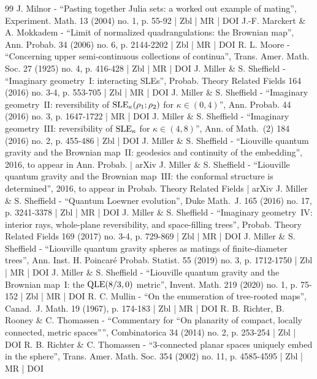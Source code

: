 \begin{thebibliography}{99}
J. Milnor - “Pasting together Julia sets: a worked out example of mating”, Experiment. Math. 13 (2004) no. 1, p. 55-92 | Zbl | MR | DOI
J.-F. Marckert \& A. Mokkadem - “Limit of normalized quadrangulations: the Brownian map”, Ann. Probab. 34 (2006) no. 6, p. 2144-2202 | Zbl | MR | DOI
R. L. Moore - “Concerning upper semi-continuous collections of continua”, Trans. Amer. Math. Soc. 27 (1925) no. 4, p. 416-428 | Zbl | MR | DOI
J. Miller \& S. Sheffield - “Imaginary geometry I: interacting SLEs”, Probab. Theory Related Fields 164 (2016) no. 3-4, p. 553-705 | Zbl | MR | DOI
J. Miller \& S. Sheffield - “Imaginary geometry II: reversibility of ${\rm SLE}_\kappa (\rho _1;\rho _2)$ for $\kappa \in (0,4)$”, Ann. Probab. 44 (2016) no. 3, p. 1647-1722 | MR | DOI
J. Miller \& S. Sheffield - “Imaginary geometry III: reversibility of $\rm SLE_\kappa $ for $\kappa \in (4,8)$”, Ann. of Math. (2) 184 (2016) no. 2, p. 455-486 | Zbl | DOI
J. Miller \& S. Sheffield - “Liouville quantum gravity and the Brownian map II: geodesics and continuity of the embedding”, 2016, to appear in Ann. Probab. | arXiv
J. Miller \& S. Sheffield - “Liouville quantum gravity and the Brownian map III: the conformal structure is determined”, 2016, to appear in Probab. Theory Related Fields | arXiv
J. Miller \& S. Sheffield - “Quantum Loewner evolution”, Duke Math. J. 165 (2016) no. 17, p. 3241-3378 | Zbl | MR | DOI
J. Miller \& S. Sheffield - “Imaginary geometry IV: interior rays, whole-plane reversibility, and space-filling trees”, Probab. Theory Related Fields 169 (2017) no. 3-4, p. 729-869 | Zbl | MR | DOI
J. Miller \& S. Sheffield - “Liouville quantum gravity spheres as matings of finite-diameter trees”, Ann. Inst. H. Poincaré Probab. Statist. 55 (2019) no. 3, p. 1712-1750 | Zbl | MR | DOI
J. Miller \& S. Sheffield - “Liouville quantum gravity and the Brownian map I: the ${\rm QLE}(8/3,0)$ metric”, Invent. Math. 219 (2020) no. 1, p. 75-152 | Zbl | MR | DOI
R. C. Mullin - “On the enumeration of tree-rooted maps”, Canad. J. Math. 19 (1967), p. 174-183 | Zbl | MR | DOI
R. B. Richter, B. Rooney \& C. Thomassen - “Commentary for “On planarity of compact, locally connected, metric spaces””, Combinatorica 34 (2014) no. 2, p. 253-254 | Zbl | DOI
R. B. Richter \& C. Thomassen - “3-connected planar spaces uniquely embed in the sphere”, Trans. Amer. Math. Soc. 354 (2002) no. 11, p. 4585-4595 | Zbl | MR | DOI

\end{thebibliography}
